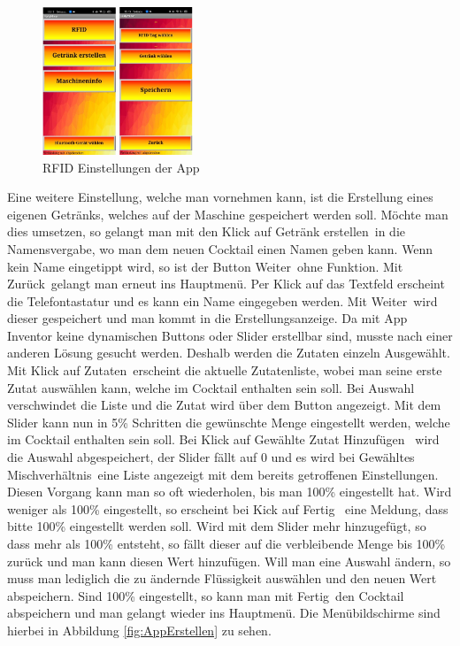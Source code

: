 \begin{figure}[h!]
	\centering
	\includegraphics[width=0.4\textwidth]{graphics/AppRFID}
	\caption{RFID Einstellungen der App}
	\label{fig:AppRFID}
\end{figure}

Eine weitere Einstellung, welche man vornehmen kann, ist die Erstellung eines eigenen Getränks, welches auf der Maschine gespeichert werden soll. Möchte man dies umsetzen, so gelangt man mit den Klick auf \flqq Getränk erstellen\frqq~in die Namensvergabe, wo man dem neuen Cocktail einen Namen geben kann. Wenn kein Name eingetippt wird, so ist der Button \flqq Weiter\frqq~ohne Funktion. Mit \flqq Zurück\frqq~gelangt man erneut ins Hauptmenü. Per Klick auf das Textfeld erscheint die Telefontastatur und es kann ein Name eingegeben werden. Mit \flqq Weiter\frqq~wird dieser gespeichert und man kommt in die Erstellungsanzeige. Da mit App Inventor keine dynamischen Buttons oder Slider erstellbar sind, musste nach einer anderen Lösung gesucht werden. Deshalb werden die Zutaten einzeln Ausgewählt. Mit Klick auf \flqq Zutaten\frqq~erscheint die aktuelle Zutatenliste, wobei man seine erste Zutat auswählen kann, welche im Cocktail enthalten sein soll. Bei Auswahl verschwindet die Liste und die Zutat wird über dem Button angezeigt. Mit dem Slider kann nun in 5\% Schritten die gewünschte Menge eingestellt werden, welche im Cocktail enthalten sein soll. Bei Klick auf \flqq Gewählte Zutat Hinzufügen\frqq~ wird die Auswahl abgespeichert, der Slider fällt auf 0 und es wird bei \flqq Gewähltes Mischverhältnis\frqq~eine Liste angezeigt mit dem bereits getroffenen Einstellungen. Diesen Vorgang kann man so oft wiederholen, bis man 100\% eingestellt hat. Wird weniger als 100\% eingestellt, so erscheint bei Kick auf \flqq Fertig\frqq~ eine Meldung, dass bitte 100\% eingestellt werden soll. Wird mit dem Slider mehr hinzugefügt, so dass mehr als 100\% entsteht, so fällt dieser auf die verbleibende Menge bis 100\% zurück und man kann diesen Wert hinzufügen. Will man eine Auswahl ändern, so muss man lediglich die zu ändernde Flüssigkeit auswählen und den neuen Wert abspeichern. Sind 100\% eingestellt, so kann man mit \flqq Fertig\frqq~den Cocktail abspeichern und man gelangt wieder ins Hauptmenü. Die Menübildschirme sind hierbei in Abbildung \ref{fig:AppErstellen} zu sehen.\\

